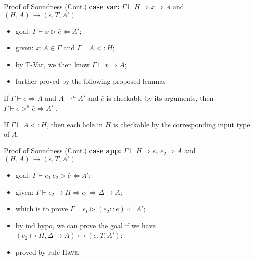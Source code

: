 \begin{frame}{Proof of Soundness (Cont.)}
	\textbf{case var:} $\Gamma \vdash H \Rightarrow x \Rightarrow A$ and $(H, A) \rightarrowtail (\bar{e}, T, A')$

	\begin{itemize}
		\item goal: $\Gamma \vdash x \triangleright \bar{e} \Leftarrow A'$;
		\item given: $x : A \in \Gamma$ and $\Gamma \vdash A <: H$;
		\item by T-Var, we then know $\Gamma \vdash x \Rightarrow A$;
		\item further proved by the following proposed lemmas
	\end{itemize}

	\noindent\makebox[\linewidth]{\rule{0.9\paperwidth}{0.4pt}}

	\begin{lemma}
		If $\Gamma \vdash e \Rightarrow A$ and $A \rightharpoonup ^n A'$ and $\bar{e}$ is checkable by its arguments, then $\Gamma \vdash e \triangleright ^{n} \bar{e} \Rightarrow A'$ .
	\end{lemma}

	\begin{lemma}
		If $\Gamma \vdash A <: H$, then each hole in $H$ is checkable by the corresponding input type of $A$.
	\end{lemma}

\end{frame}

\begin{frame}{Proof of Soundness (Cont.)}
	\textbf{case app:} $\Gamma \vdash H \Rightarrow e_1 ~ e_2 \Rightarrow A$ and $(H, A) \rightarrowtail (\bar{e}, T, A')$

	\begin{itemize}
		\item goal: $\Gamma \vdash e_1 ~ e_2 \triangleright \bar{e} \Leftarrow A'$;
		\item given: $\Gamma \vdash \boxed{e_2} \mapsto H \Rightarrow e_1 \Rightarrow \Delta \rightarrow A$;
		\item which is to prove $\Gamma \vdash e_1 \triangleright (e_2 :: \bar{e}) \Leftarrow A'$;
		\item by ind hypo, we can prove the goal if we have $(e_2 \mapsto H, \Delta \rightarrow A) \rightarrowtail (\bar{e}, T, A')$;
		\item proved by rule \textsc{Have}.
	\end{itemize}

\end{frame}

